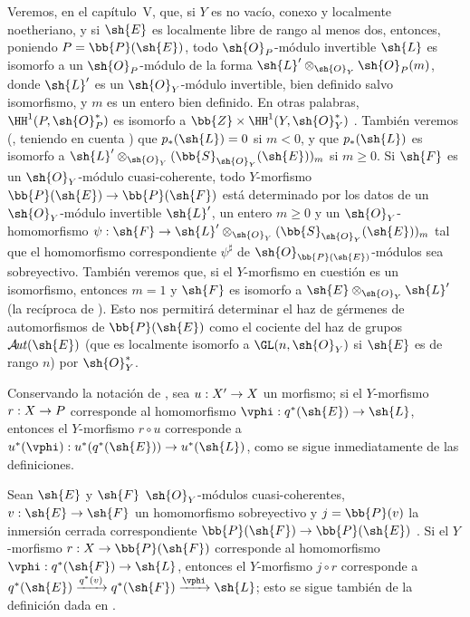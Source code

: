 \documentclass[oneside,10pt]{amsart}
\makeatletter
\renewcommand{\geq}{\geqslant}
\newcommand{\ega@arrow}[2]{\mathchoice{#1}{#2}{#2}{#2}}
\renewcommand{\to}{\ega@arrow{\longrightarrow}{\rightarrow}}
\def\shAut{\mathcal{A}\!\mathit{ut}}
\newcommand{\oldpage}[2][]{\marginnote{\normalfont\footnotesize\textbf{#1}~|~#2}\ignorespaces}
\let\EGAOriginalLabel\label
\renewcommand{\label}[1]{\phantomsection\EGAOriginalLabel{#1}}
\makeatother
\begin{document}
\begin{remark}[4.2.7]
\label{II.4.2.7}
Veremos, en el capítulo~V, que, si $Y$ es no vacío, conexo y localmente noetheriano, y si $\sh{E}$ es localmente libre de rango al menos dos, entonces, poniendo $P=\bb{P}(\sh{E})$, todo $\sh{O}_P$-módulo invertible $\sh{L}$ es isomorfo a un $\sh{O}_P$-módulo de la forma $\sh{L}'\otimes_{\sh{O}_Y}\sh{O}_P(m)$, donde $\sh{L}'$ es un $\sh{O}_Y$-módulo invertible, bien definido salvo isomorfismo, y $m$ es un entero bien definido.
En otras palabras, $\HH^1(P,\sh{O}_P^*)$ es isomorfo a $\bb{Z}\times\HH^1(Y,\sh{O}_Y^*)$ .
También veremos (, teniendo en cuenta ) que $p_*(\sh{L})=0$ si $m<0$, y que $p_*(\sh{L})$ es isomorfo a $\sh{L}'\otimes_{\sh{O}_Y}(\bb{S}_{\sh{O}_Y}(\sh{E}))_m$ si $m\geq0$.
Si $\sh{F}$ es un $\sh{O}_Y$-módulo cuasi-coherente, todo $Y$-morfismo $\bb{P}(\sh{E})\to\bb{P}(\sh{F})$ está determinado por los datos de un $\sh{O}_Y$-módulo invertible $\sh{L}'$, un entero $m\geq0$ y un $\sh{O}_Y$-homomorfismo $\psi:\sh{F}\to\sh{L}'\otimes_{\sh{O}_Y}(\bb{S}_{\sh{O}_Y}(\sh{E}))_m$ tal que el homomorfismo correspondiente $\psi^\sharp$ de $\sh{O}_{\bb{P}(\sh{E})}$-módulos sea sobreyectivo.
También veremos que, si el $Y$-morfismo en cuestión es un isomorfismo, entonces $m=1$ y $\sh{F}$ es isomorfo a $\sh{E}\otimes_{\sh{O}_Y}\sh{L}'$ (la recíproca de ).
Esto nos permitirá determinar el haz de gérmenes de automorfismos de $\bb{P}(\sh{E})$ como el cociente del haz de grupos $\shAut(\sh{E})$ (que es localmente isomorfo a $\GL(n,\sh{O}_Y)$ si $\sh{E}$ es de rango $n$) por $\sh{O}_Y^*$.
\end{remark}

\begin{env}[4.2.8]
\label{II.4.2.8}
Conservando la notación de , sea $u:X'\to X$ un morfismo;
si el $Y$-morfismo $r:X\to P$ corresponde al homomorfismo $\vphi:q^*(\sh{E})\to\sh{L}$, entonces el $Y$-morfismo $r\circ u$ corresponde a $u^*(\vphi):u^*(q^*(\sh{E}))\to u^*(\sh{L})$, como se sigue inmediatamente de las definiciones.
\end{env}

\begin{env}[4.2.9]
\label{II.4.2.9}
Sean $\sh{E}$ y $\sh{F}$ $\sh{O}_Y$-módulos cuasi-coherentes, $v:\sh{E}\to\sh{F}$ un homomorfismo sobreyectivo y $j=\bb{P}(v)$ la inmersión cerrada correspondiente $\bb{P}(\sh{F})\to\bb{P}(\sh{E})$ .
Si el $Y$-morfismo $r:X\to\bb{P}(\sh{F})$ corresponde al homomorfismo $\vphi:q^*(\sh{F})\to\sh{L}$, entonces el
\oldpage[II]{76}
$Y$-morfismo $j\circ r$ corresponde a $q^*(\sh{E})\xrightarrow{q^*(v)}q^*(\sh{F})\xrightarrow{\vphi}\sh{L}$;
esto se sigue también de la definición dada en .
\end{env}
\end{document}
